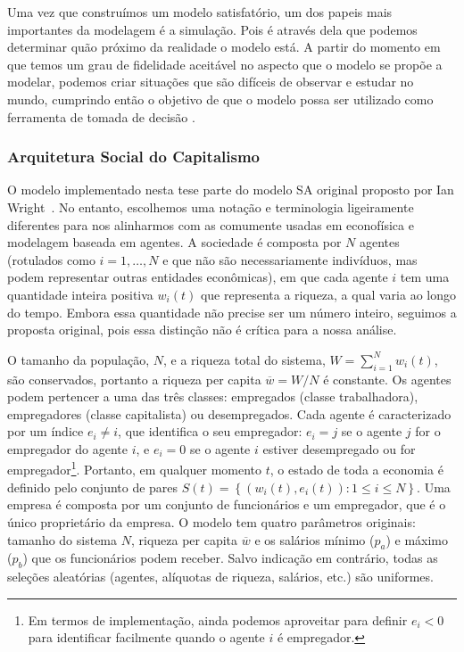 Uma vez que construímos um modelo satisfatório, um dos papeis mais importantes da modelagem é a simulação. Pois é através dela que podemos determinar quão próximo da realidade o modelo está. A partir do momento em que temos um grau de fidelidade aceitável no aspecto que o modelo se propõe a modelar, podemos criar situações que são difíceis de observar e estudar no mundo, cumprindo então o objetivo de que o modelo possa ser utilizado como ferramenta de tomada de decisão \cite{UFRGS}. 

\subsubsection*{Arquitetura Social do Capitalismo}


O modelo implementado nesta tese parte do modelo SA original proposto por Ian Wright~\cite{WRIGHT2005589}. No entanto, escolhemos uma notação e terminologia ligeiramente diferentes para nos alinharmos com as comumente usadas em econofísica e modelagem baseada em agentes. A sociedade é composta por $N$ agentes (rotulados como $i=1,\dots,N$ e que não são necessariamente indivíduos, mas podem representar outras entidades econômicas), em que cada agente $i$ tem uma quantidade inteira positiva $w_i(t)$ que representa a riqueza, a qual varia ao longo do tempo. %
Embora essa quantidade não precise ser um número inteiro, seguimos a proposta original, pois essa distinção não é crítica para a nossa análise.

O tamanho da população, $N$, e a riqueza total do sistema, $W= \sum_{i=1}^N w_i(t)$, são conservados, portanto a riqueza per capita $\overline{w}=W/N$ é constante.  Os agentes podem pertencer a uma das três classes: empregados (classe trabalhadora), empregadores (classe capitalista) ou desempregados.  Cada agente é caracterizado por um índice $e_i\neq i$, que identifica o seu empregador: $e_i = j$ se o agente $j$ for o empregador do agente $i$, e $e_i = 0$ se o agente $i$ estiver desempregado ou for empregador\footnote{Em termos de implementação, ainda podemos aproveitar para definir $e_i<0$  para identificar facilmente quando o agente $i$ é empregador.}. Portanto, em qualquer momento $t$,  o estado de toda a economia é definido pelo conjunto de pares $S(t) = \left\{ \left( w_i(t), e_i(t) \right) :1\leq i\leq N \right\}$.
%
Uma empresa é composta por um conjunto de funcionários e um empregador, que é o único proprietário da empresa. O modelo tem quatro parâmetros originais: tamanho do sistema $N$, riqueza per capita $\overline{w}$ e os salários mínimo ($p_a$) e máximo ($p_b$) que os funcionários podem receber. Salvo indicação em contrário, todas as seleções aleatórias (agentes, alíquotas de riqueza, salários, etc.) são uniformes.

